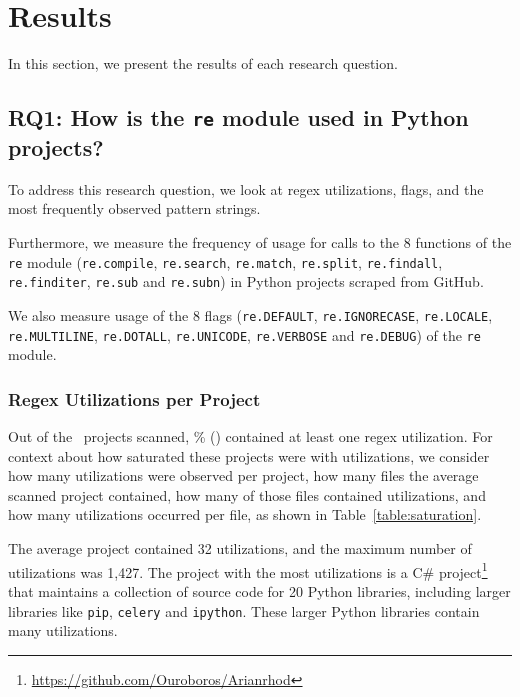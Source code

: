 \section{Results}
\label{sec:results}

In this section, we present the results of each research question.

\subsection{RQ1: How  is the {\tt re} module used in Python projects?}
To address this research question, we look at regex utilizations, flags, and the most frequently observed pattern strings.


Furthermore, we measure the frequency of usage for calls to the 8 functions of the {\tt re} module ({\tt re.compile}, {\tt re.search}, {\tt re.match}, {\tt re.split}, {\tt re.findall}, {\tt re.finditer}, {\tt re.sub} and {\tt re.subn}) in Python projects scraped from GitHub.

We also measure usage of the 8 flags ({\tt re.DEFAULT}, {\tt re.IGNORECASE}, {\tt re.LOCALE}, {\tt re.MULTILINE}, {\tt re.DOTALL}, {\tt re.UNICODE}, {\tt re.VERBOSE} and {\tt re.DEBUG}) of the {\tt re} module.



\subsubsection{Regex Utilizations per Project}
Out of the \ projects scanned, \% () contained at least one regex utilization.  For context about how saturated these projects were with utilizations, we consider how many utilizations were observed per project, how many files the average scanned project  contained, how many of those files contained utilizations, and how many utilizations occurred per file, as shown in Table~\ref{table:saturation}.

The average project contained 32 utilizations, and the maximum number of utilizations was 1,427.  The project with the most utilizations is a C\# project\footnote{\url{https://github.com/Ouroboros/Arianrhod}} that maintains a collection of source code for 20 Python libraries, including larger libraries like {\tt pip}, {\tt celery} and {\tt ipython}.  These larger Python libraries contain many utilizations.



